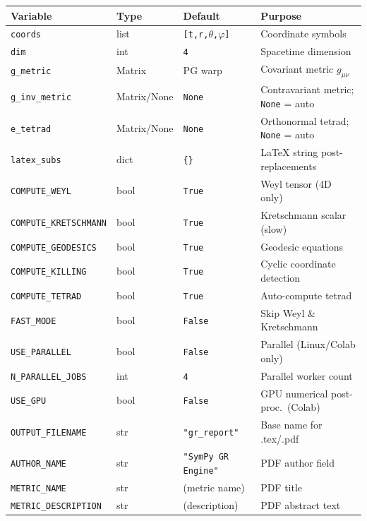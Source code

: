 \documentclass[11pt,a4paper]{article}
\newcommand{\code}[1]{\texttt{\small#1}}
\begin{document}
\begin{center}
\begin{longtable}{p{3.6cm}p{1.8cm}p{2.2cm}p{6cm}}
  \toprule
  Variable & Type & Default & Purpose \\
  \midrule\endhead
  \code{coords} & list & \code{[t,r,$\theta$,$\varphi$]} & Coordinate symbols \\
  \code{dim} & int & \code{4} & Spacetime dimension \\
  \code{g\_metric} & Matrix & PG warp & Covariant metric $g_{\mu\nu}$ \\
  \code{g\_inv\_metric} & Matrix/None & \code{None} & Contravariant metric; \code{None} = auto \\
  \code{e\_tetrad} & Matrix/None & \code{None} & Orthonormal tetrad; \code{None} = auto \\
  \code{latex\_subs} & dict & \code{\{\}} & LaTeX string post-replacements \\
  \code{COMPUTE\_WEYL} & bool & \code{True} & Weyl tensor (4D only) \\
  \code{COMPUTE\_KRETSCHMANN} & bool & \code{True} & Kretschmann scalar (slow) \\
  \code{COMPUTE\_GEODESICS} & bool & \code{True} & Geodesic equations \\
  \code{COMPUTE\_KILLING} & bool & \code{True} & Cyclic coordinate detection \\
  \code{COMPUTE\_TETRAD} & bool & \code{True} & Auto-compute tetrad \\
  \code{FAST\_MODE} & bool & \code{False} & Skip Weyl \& Kretschmann \\
  \code{USE\_PARALLEL} & bool & \code{False} & Parallel (Linux/Colab only) \\
  \code{N\_PARALLEL\_JOBS} & int & \code{4} & Parallel worker count \\
  \code{USE\_GPU} & bool & \code{False} & GPU numerical post-proc.\ (Colab) \\
  \code{OUTPUT\_FILENAME} & str & \code{"gr\_report"} & Base name for .tex/.pdf \\
  \code{AUTHOR\_NAME} & str & \code{"SymPy GR Engine"} & PDF author field \\
  \code{METRIC\_NAME} & str & (metric name) & PDF title \\
  \code{METRIC\_DESCRIPTION} & str & (description) & PDF abstract text \\
  \bottomrule
\end{longtable}
\end{center}
\end{document}
